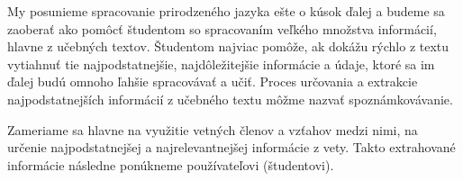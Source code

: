 My posunieme spracovanie prirodzeného jazyka ešte o kúsok ďalej a budeme sa zaoberať ako pomôcť študentom so spracovaním veľkého množstva informácií, hlavne z učebných textov. Študentom najviac pomôže, ak dokážu rýchlo z textu vytiahnuť tie najpodstatnejšie, najdôležitejšie informácie a údaje, ktoré sa im ďalej budú omnoho ľahšie spracovávať a učiť. Proces určovania a extrakcie najpodstatnejších informácií z učebného textu môžme nazvať spoznámkovávanie.

Zameriame sa hlavne na využitie vetných členov a vzťahov medzi nimi, na určenie najpodstatnejšej a najrelevantnejšej informácie z vety. Takto extrahované informácie následne ponúkneme používateľovi (študentovi).